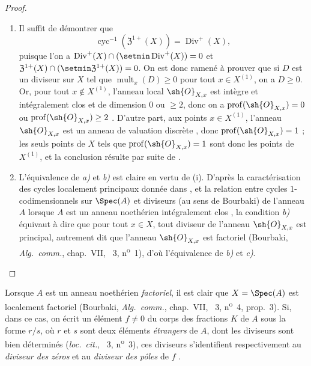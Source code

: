 \begin{proof}
\begin{enumerate}[label=(\roman*)]
  \item Il suffit de démontrer que
\[
\label{IV.21.6.9.1}
  \operatorname{cyc}^{-1}(\mathfrak{Z}^{1+}(X))=\operatorname{Div}^+(X),
  \tag{21.6.9.1}
\]
puisque l'on a $\operatorname{Div}^+(X)\cap(\setmin\operatorname{Div}^+(X))=0$ et $\mathfrak{Z}^{1+}(X)\cap(\setmin\mathfrak{Z}^{1+}(X))=0$.
On est donc ramené à prouver que si $D$ est un diviseur sur $X$ tel que $\operatorname{mult}_x(D)\geq0$ pour tout $x\in X^{(1)}$, on a $D\geq0$.
Or, pour tout $x\notin X^{(1)}$, l'anneau local $\sh{O}_{X,x}$ est intègre et intégralement clos et
de dimension $0$ ou $\geq2$, donc on a $\operatorname{prof}(\sh{O}_{X,x})=0$ ou $\operatorname{prof}(\sh{O}_{X,x})\geq2$ .
D'autre part, aux points $x\in X^{(1)}$, l'anneau $\sh{O}_{X,x}$ est un anneau de valuation discrète , donc $\operatorname{prof}(\sh{O}_{X,x})=1$ ;
les seuls points de $X$ tels que $\operatorname{prof}(\sh{O}_{X,x})=1$ sont donc les points de $X^{(1)}$, et la conclusion résulte par suite de .

  \item L'équivalence de \emph{a)} et \emph{b)} est claire en vertu de (i).
D'après la caractérisation des cycles localement principaux donnée dans , et la relation entre cycles $1$-codimensionnels sur $\Spec(A)$ et diviseurs (au sens de Bourbaki) de l'anneau $A$ lorsque $A$ est un anneau noethérien intégralement clos , la condition \emph{b)} équivaut à dire que pour tout $x\in X$, tout diviseur de l'anneau $\sh{O}_{X,x}$ est principal, autrement dit que l'anneau $\sh{O}_{X,x}$ est factoriel (Bourbaki, \emph{Alg.\ comm.}, chap.~VII, \textsection~3, n\textsuperscript{o}~1), d'où l'équivalence de \emph{b)} et \emph{c)}.
\end{enumerate}
\end{proof}

\begin{env}[21.6.9.2]
\label{IV.21.6.9.2}
Lorsque $A$ est un anneau noethérien \emph{factoriel}, il est clair que $X=\Spec(A)$ est localement factoriel (Bourbaki, \emph{Alg.\ comm.}, chap.~VII, \textsection~3, n\textsuperscript{o}~4, prop.~3).
Si, dans ce cas, on écrit un élément $f\neq0$ du corps des fractions $K$ de $A$ sous la forme $r/s$, où $r$ et $s$ sont deux éléments \emph{étrangers} de $A$, dont les diviseurs sont bien déterminés (\emph{loc.\ cit.}, \textsection~3, n\textsuperscript{o}~3), ces diviseurs s'identifient respectivement au \emph{diviseur des zéros} et au \emph{diviseur des pôles} de $f$ .
\end{env}

